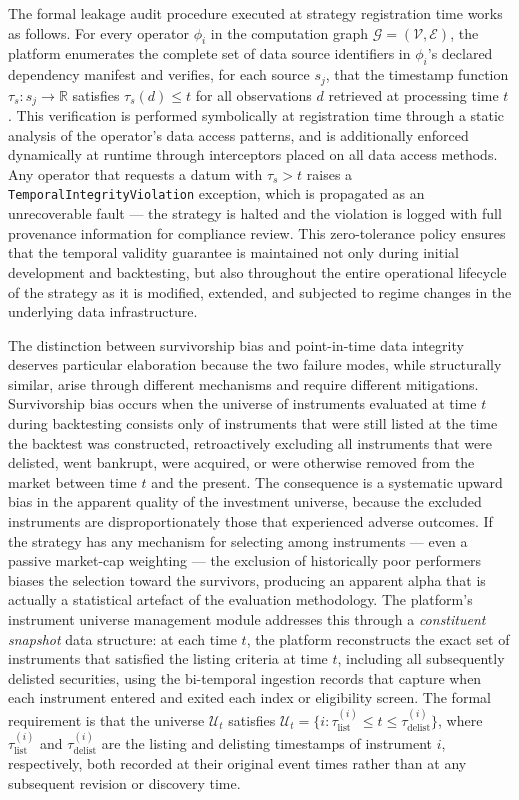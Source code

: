 \documentclass[12pt,openany]{book}
\numberwithin{equation}{chapter}
\theoremstyle{plain}
\theoremstyle{definition}
\theoremstyle{remark}
\begin{document}
The formal leakage audit procedure executed at strategy registration time works as follows. For every operator $\phi_i$ in the computation graph $\mathcal{G} = (\mathcal{V}, \mathcal{E})$, the platform enumerates the complete set of data source identifiers in $\phi_i$'s declared dependency manifest and verifies, for each source $s_j$, that the timestamp function $\tau_s : s_j \to \mathbb{R}$ satisfies $\tau_s(d) \leq t$ for all observations $d$ retrieved at processing time $t$. This verification is performed symbolically at registration time through a static analysis of the operator's data access patterns, and is additionally enforced dynamically at runtime through interceptors placed on all data access methods. Any operator that requests a datum with $\tau_s > t$ raises a \texttt{TemporalIntegrityViolation} exception, which is propagated as an unrecoverable fault — the strategy is halted and the violation is logged with full provenance information for compliance review. This zero-tolerance policy ensures that the temporal validity guarantee is maintained not only during initial development and backtesting, but also throughout the entire operational lifecycle of the strategy as it is modified, extended, and subjected to regime changes in the underlying data infrastructure.

The distinction between survivorship bias and point-in-time data integrity deserves particular elaboration because the two failure modes, while structurally similar, arise through different mechanisms and require different mitigations. Survivorship bias occurs when the universe of instruments evaluated at time $t$ during backtesting consists only of instruments that were still listed at the time the backtest was constructed, retroactively excluding all instruments that were delisted, went bankrupt, were acquired, or were otherwise removed from the market between time $t$ and the present. The consequence is a systematic upward bias in the apparent quality of the investment universe, because the excluded instruments are disproportionately those that experienced adverse outcomes. If the strategy has any mechanism for selecting among instruments — even a passive market-cap weighting — the exclusion of historically poor performers biases the selection toward the survivors, producing an apparent alpha that is actually a statistical artefact of the evaluation methodology. The platform's instrument universe management module addresses this through a \emph{constituent snapshot} data structure: at each time $t$, the platform reconstructs the exact set of instruments that satisfied the listing criteria at time $t$, including all subsequently delisted securities, using the bi-temporal ingestion records that capture when each instrument entered and exited each index or eligibility screen. The formal requirement is that the universe $\mathcal{U}_t$ satisfies $\mathcal{U}_t = \{i : \tau_{\text{list}}^{(i)} \leq t \leq \tau_{\text{delist}}^{(i)}\}$, where $\tau_{\text{list}}^{(i)}$ and $\tau_{\text{delist}}^{(i)}$ are the listing and delisting timestamps of instrument $i$, respectively, both recorded at their original event times rather than at any subsequent revision or discovery time.
\end{document}
